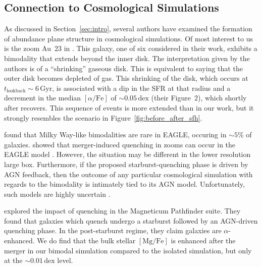 \documentclass[twocolumn,linenumbers,trackchanges]{aastex631}
\newcommand{\Gyr}{\ensuremath{\textrm{Gyr}}}
\newcommand{\MgFe}{\ensuremath{[\textrm{Mg}/\textrm{Fe}]}}
\newcommand{\alphaFe}{\ensuremath{[\alpha/\textrm{Fe}]}}
\newcommand{\dex}{\ensuremath{\textrm{dex}}}
\begin{document}

\subsection{Connection to Cosmological Simulations}\label{ssec:cosmo}
As discussed in Section~\ref{sec:intro}, several authors have examined the formation of abundance plane structure in cosmological simulations. Of most interest to us is the zoom Au~23 in \citet{2018MNRAS.474.3629G}. This galaxy, one of six considered in their work, exhibits a bimodality that extends beyond the inner disk. The interpretation given by the authors is of a ``shrinking'' gaseous disk. This is equivalent to saying that the outer disk becomes depleted of gas. This shrinking of the disk, which occurs at $t_{\textrm{lookback}}\sim6\,\Gyr$, is associated with a dip in the SFR at that radius and a decrement in the median \alphaFe{} of $\sim0.05\,\dex$ (their Figure~2), which shortly after recovers. This sequence of events is more extended than in our work, but it strongly resembles the scenario in Figure~\ref{fig:before_after_sfh}.

\citet{2018MNRAS.477.5072M} found that Milky Way-like bimodalities are rare in EAGLE, occuring in $\sim5\%$ of galaxies. \citet{2021MNRAS.501..236D,2022MNRAS.515.1430D} showed that merger-induced quenching in zooms can occur in the EAGLE model \citep[see also][]{2017MNRAS.465..547P}. However, the situation may be different in the lower resolution large box. Furthermore, if the proposed starburst-quenching phase is driven by AGN feedback, then the outcome of any particular cosmological simulation with regards to the bimodality is intimately tied to its AGN model. Unfortunately, such models are highly uncertain \citep[e.g.][]{2022MNRAS.511.3751H}.

\citet{2023arXiv231016085K} explored the impact of quenching in the Magneticum Pathfinder suite. They found that galaxies which quench undergo a starburst followed by an AGN-driven quenching phase. In the post-starburst regime, they claim galaxies are $\alpha$-enhanced. We do find that the bulk stellar \MgFe{} is enhanced after the merger in our bimodal simulation compared to the isolated simulation, but only at the $\sim0.01\,\dex$ level.
\end{document}
